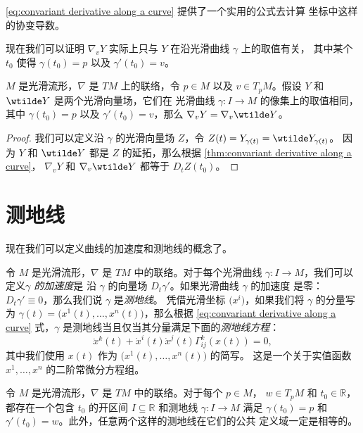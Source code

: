 \documentclass[fontset=none]{Notes}
\begin{document}
\eqref{eq:convariant derivative along a curve} 提供了一个实用的公式去计算
坐标中这样的协变导数。

现在我们可以证明 $\nabla_vY$ 实际上只与 $Y$ 在沿光滑曲线 $\gamma$ 上的取值有关，
其中某个 $t_0$ 使得 $\gamma(t_0)=p$ 以及 $\gamma'(t_0)=v$。

\begin{proposition}
  $M$ 是光滑流形，$\nabla$ 是 $TM$ 上的联络，令 $p\in M$ 以及 
  $v\in T_pM$。假设 $Y$ 和 $\wtilde Y$ 是两个光滑向量场，它们在
  光滑曲线 $\gamma:I\to M$ 的像集上的取值相同，其中
  $\gamma(t_0)=p$ 以及 $\gamma'(t_0)=v$，那么 $\nabla_vY=\nabla_v\wtilde Y$。
\end{proposition}
\begin{proof}
  我们可以定义沿 $\gamma$ 的光滑向量场 $Z$，令 $Z(t)=Y_{\gamma(t)}=\wtilde Y_{\gamma(t)}$。
  因为 $Y$ 和 $\wtilde Y$ 都是 $Z$ 的延拓，那么根据
  \autoref{thm:convariant derivative along a curve}，
  $\nabla_vY$ 和 $\nabla_v\wtilde Y$ 都等于 $D_tZ(t_0)$。
\end{proof}

\section{测地线}

现在我们可以定义曲线的加速度和测地线的概念了。

令 $M$ 是光滑流形，$\nabla$ 是 $TM$ 中的联络。对于每个光滑曲线
$\gamma:I\to M$，我们可以定义\emph{$\gamma$ 的加速度}是
沿 $\gamma$ 的向量场 $D_t\gamma'$。如果光滑曲线 $\gamma$ 的加速度
是零：$D_t\gamma'\equiv 0$，那么我们说 $\gamma$ 是\emph{测地线}。
凭借光滑坐标 $\bigl(x^i\bigr)$，如果我们将 $\gamma$ 的分量写为
$\gamma(t)=\bigl(x^1(t),\dots,x^n(t)\bigr)$，那么根据 \eqref{eq:convariant derivative along a curve}
式，$\gamma$ 是测地线当且仅当其分量满足下面的\emph{测地线方程}：
\begin{equation}\label{eq:geodesic curve equation}
  \ddot{x}^k(t)+\dot x^i(t)\dot x^j(t)\Gamma_{ij}^k(x(t))=0,
\end{equation}
其中我们使用 $x(t)$ 作为 $\bigl(x^1(t),\dots,x^n(t)\bigr)$ 的简写。
这是一个关于实值函数 $x^1,\dots,x^n$ 的二阶常微分方程组。

\begin{theorem}[测地线的存在唯一性]
  令 $M$ 是光滑流形，$\nabla$ 是 $TM$ 中的联络。对于每个 $p\in M$，
  $w\in T_pM$ 和 $t_0\in \mathbb{R}$，都存在一个包含 $t_0$
  的开区间 $I\subseteq \mathbb{R}$ 和测地线 $\gamma:I\to M$ 满足
  $\gamma(t_0)=p$ 和 $\gamma'(t_0)=w$。此外，任意两个这样的测地线在它们的公共
  定义域一定是相等的。
\end{theorem}
\end{document}

